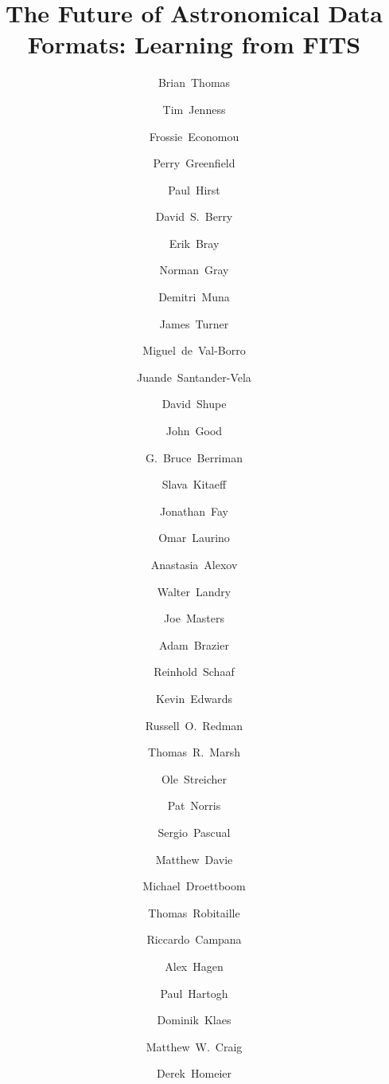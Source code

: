 \documentclass[final,authoryear,5p,times,twocolumn]{elsarticle}
\begin{document}
\begin{frontmatter}



\title{The Future of Astronomical Data Formats: Learning from FITS}


\author[noao]{Brian~Thomas}
\author[cornell]{Tim~Jenness}
\author[noao]{Frossie~Economou}
\author[stsci]{Perry~Greenfield}
\author[geminin]{Paul~Hirst}
\author[jac]{David~S.~Berry}
\author[stsci]{Erik~Bray}
\author[glasgow]{Norman~Gray}
\author[ohio]{Demitri~Muna}
\author[geminis]{James~Turner}
\author[princeton]{Miguel~de~Val-Borro}
\author[iaa,ska]{Juande~Santander-Vela}
\author[ipac]{David~Shupe}
\author[ipac]{John~Good}
\author[ipac]{G.~Bruce~Berriman}
\author[icrar]{Slava~Kitaeff}
\author[microsoft]{Jonathan~Fay}
\author[sao]{Omar~Laurino}
\author[stsci]{Anastasia~Alexov}
\author[ipac]{Walter~Landry}
\author[nrao]{Joe~Masters}
\author[cornell]{Adam~Brazier}
\author[aifa]{Reinhold~Schaaf}
\author[uwaterloo]{Kevin~Edwards}
\author[jac]{Russell~O.~Redman}
\author[warwick]{Thomas~R.~Marsh}
\author[aip]{Ole~Streicher}
\author[noao]{Pat~Norris}
\author[ucm]{Sergio~Pascual}
\author[unsw]{Matthew~Davie}
\author[stsci]{Michael~Droettboom}
\author[mpia]{Thomas~Robitaille}
\author[iasf]{Riccardo~Campana}
\author[psu]{Alex~Hagen}
\author[mps]{Paul~Hartogh}
\author[aifa]{Dominik~Klaes}
\author[msum]{Matthew~W.~Craig}
\author[cral]{Derek~Homeier}



\end{frontmatter}
\end{document}
